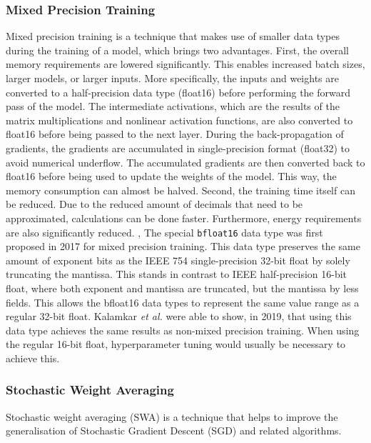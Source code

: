 \subsubsection{Mixed Precision Training}
Mixed precision training is a technique that makes use of smaller data types during the training of a model, which brings two advantages. First, the overall memory requirements are lowered significantly. This enables increased batch sizes, larger models, or larger inputs. More specifically, the inputs and weights are converted to a half-precision data type (float16) before performing the forward pass of the model. The intermediate activations, which are the results of the matrix multiplications and nonlinear activation functions, are also converted to float16 before being passed to the next layer. During the back-propagation of gradients, the gradients are accumulated in single-precision format (float32) to avoid numerical underflow. The accumulated gradients are then converted back to float16 before being used to update the weights of the model. This way, the memory consumption can almost be halved. \cite{Micikevicius2017Mixed}
Second, the training time itself can be reduced. Due to the reduced amount of decimals that need to be approximated, calculations can be done faster. Furthermore, energy requirements are also significantly reduced. \cite{Micikevicius2017Mixed}, \cite{Tagliavini2017Transprecision}
The special \verb|bfloat16| data type was first proposed in 2017 for mixed precision training. This data type preserves the same amount of exponent bits as the IEEE 754 single-precision 32-bit float by solely truncating the mantissa. This stands in contrast to IEEE half-precision 16-bit float, where both exponent and mantissa are truncated, but the mantissa by less fields. This allows the bfloat16 data types to represent the same value range as a regular 32-bit float. \cite{Tagliavini2017Transprecision}
Kalamkar \textit{et al.} were able to show, in 2019, that using this data type achieves the same results as non-mixed precision training. When using the regular 16-bit float, hyperparameter tuning would usually be necessary to achieve this. \cite{Kalamkar2019Study}


\subsubsection{Stochastic Weight Averaging}
Stochastic weight averaging (SWA) is a technique that helps to improve the generalisation of Stochastic Gradient Descent (SGD) and related algorithms.

